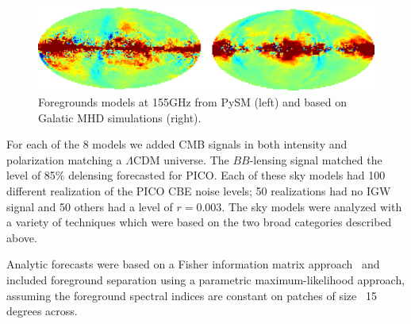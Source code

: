 \documentclass[PICOReport.tex]{subfiles}
\begin{document}
\begin{figure}[ht]
\begin{center}
\includegraphics[width=.8\textwidth]{images/pysm_foregrounds_155GHz.png}
\vspace{-0.1in}
\caption{Foregrounds models at 155GHz from PySM (left) \cite{thorne2018_pysm} and based on Galatic MHD simulations (right). }
\label{fig:pysm_foregrounds}
\end{center}
\vspace{-0.1in}
\end{figure}

For each of the 8 models we added CMB signals in both intensity and polarization matching a $\Lambda$CDM universe. The $BB$-lensing signal matched the level of 85\% delensing forecasted for PICO. Each of these sky models had 100 different realization of the PICO CBE noise levels; 50 realizations had no \ac{IGW} signal and 50 others had a level of $r=0.003$. 
The sky models were analyzed with a variety of techniques which were based on the two broad categories described above. 

Analytic forecasts were based on a Fisher information matrix approach~\citep{errard_feeney_2016} and included foreground separation
using a parametric maximum-likelihood approach, assuming the foreground spectral indices are constant on patches of size ~15 degrees across. 
\end{document}

